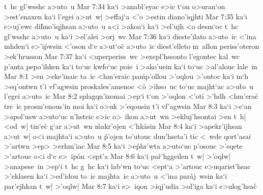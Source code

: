 t~hc
gl'wsshc
a>uto~u\bibvsend
\vs Mar 7:34
ka`i
>anabl'eyac
e>ic
t`on
o>uran`on
>est'enaxen
ka`i
l'egei
a>ut~w|
>effaj`a
<'o
>estin
diano'iqjhti\bibvsend
\vs Mar 7:35
ka`i
e>uj'ewc
di\r{h}no'iqjhsan
a>uto~u
a<i
>akoa`i
ka`i
>el'ujh
<o
desm`oc
t~hc
gl'wsshc
a>uto~u
ka`i
>el'alei
>orj~wc\bibvsend
\vs Mar 7:36
ka`i
dieste'ilato
a>uto~ic
<'ina
mhden`i
e>'i\r{p}wsin
<'oson
d`e
a>ut`oc\r{}
a>uto~ic
diest'elleto
m~allon
periss'oteron
>ek'hrusson\bibvsend
\vs Mar 7:37
ka`i
<uperperiss~wc
>exepl'hssonto
l'egontec
kal~wc
p'anta
pepo'ihken
ka`i
to`uc
kwfo`uc
poie~i
>ako'uein
ka`i
to`uc
>al'alouc
lale~in\bibvsend
\vs Mar 8:1
>en
>eke'inaic
ta~ic
<hm'eraic
pa\r{m}p'ollou
>'oqlou
>'ontoc
ka`i
m`h
>eq'ontwn
t'i
vf'agwsin
proskales'amenoc
<o\r{}
>ihso~uc
to`uc
majht`ac
a>u\r{t}o~u
l'egei
a>uto~ic\bibvsend
\vs Mar 8:2
splagqn'izomai
>ep`i
t`on
>'oqlon
<'oti
>'hdh
<hm'erac\r{}
tre~ic
prosm'enous'in
moi
ka`i
o>uk
>'eqousin
t'i
vf'agwsin\bibvsend
\vs Mar 8:3
ka`i
>e`an
>apol'usw
a>uto`uc
n'hsteic
e>ic
o>~ikon
a>ut~wn
>ekluj'hsontai
>en
t~h|
<od~w|
tin`ec\r{}
g`ar
a>ut~wn
\r{m}akr'ojen
<'hk\r{a}sin\bibvsend
{}
\vs Mar 8:4
ka`i
>apekr'ijhsan
a>ut~w|
o<i
majhta`i
a>uto~u
\r{p}'ojen
to'utouc
dun'hseta'i
tic
<~wde
qort'asai
>'artwn
>ep>
>erhm'iac\bibvsend
\vs Mar 8:5
ka`i
>e\r{p}hr'wta
a>uto`uc
p'osouc
>'eqete
>'artouc
o<i
d`e
e>~ip\r{o}n
<ept'a\bibvsend
\vs Mar 8:6
ka`i
pa\r{r}'hggeilen
t~w|
>'oqlw|
>anapese~in
>ep`i
t~hc
g~hc
ka`i
lab`wn
to`uc
<ept`a
>'artouc
e>uqarist'hsac
>'eklasen
ka`i
>ed'idou
to~ic
majhta~ic
a>uto~u
<'ina
par\r{a}j~wsin
ka`i
par'ejhkan
t~w|
>'oqlw|\bibvsend
\vs Mar 8:7
ka`i
e>~iqon
>iqj'udia
>ol'iga
ka`i
e>ulog'hsac\r{}
